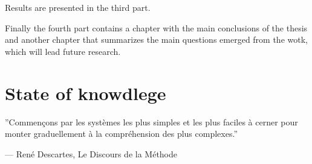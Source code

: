 Results are presented in the third part.

Finally the fourth part contains a chapter with the main conclusions of the thesis and another chapter that summarizes the main questions emerged from the wotk, which will lead future research.


 
\chapter{State of knowdlege\label{cha:state}}

\epigraphfontsize{\small\itshape}
\epigraph{''Commençons par les systèmes les plus simples et les plus faciles à cerner pour monter graduellement à la compréhension des plus complexes.''}{--- \textup{René Descartes}, Le Discours de la Méthode}

